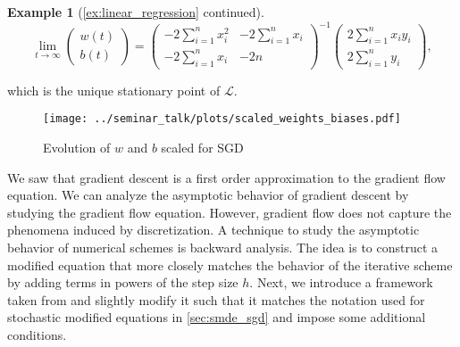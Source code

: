 \documentclass[12pt]{article}
\theoremstyle{definition}
\newtheorem{example}[example]{Example}
\numberwithin{equation}{section}
\newcommand{\CL}{\mathcal{L}}
\begin{document}
\begin{example}[\autoref{ex:linear_regression} continued]
\begin{equation*}
    \lim_{t \rightarrow \infty} 
    \begin{pmatrix}
      w(t) \\
      b(t)
    \end{pmatrix}
    = 
    \begin{pmatrix}
      -2  \displaystyle\sum_{i=1}^n x_i^2  &  -2  \displaystyle\sum_{i=1}^n x_i      \\
        -2  \displaystyle\sum_{i=1}^n x_i  &  -2n      
    \end{pmatrix}^{-1}
    \begin{pmatrix}
      2  \displaystyle\sum_{i=1}^n x_i y_i     \\
      2  \displaystyle\sum_{i=1}^n y_i    
    \end{pmatrix},
  \end{equation*}
  
  which is the unique stationary point of $\CL$.
  \begin{figure}[htb]
    \centering
    \texttt{[image: ../seminar\_talk/plots/scaled\_weights\_biases.pdf]}
    \caption{Evolution of $w$ and $b$ scaled for SGD}
    \label{fig:scaled_weights_biases}
  \end{figure}
\end{example}
We saw that gradient descent is a first order approximation to the gradient flow equation. We can analyze the asymptotic behavior of gradient descent by studying the gradient flow equation. However, gradient flow does not capture the phenomena induced by discretization. 
A technique to study the asymptotic behavior of numerical schemes is backward analysis. The idea is to construct a modified equation that more closely matches the behavior of the iterative scheme by adding terms in powers of the step size $h$.
Next, we introduce a framework taken from \cite{hairerGeometricNumericalIntegration2013} and slightly modify it such that it matches the notation used for stochastic modified equations in \autoref{sec:smde_sgd} and impose some additional conditions.
\end{document}
